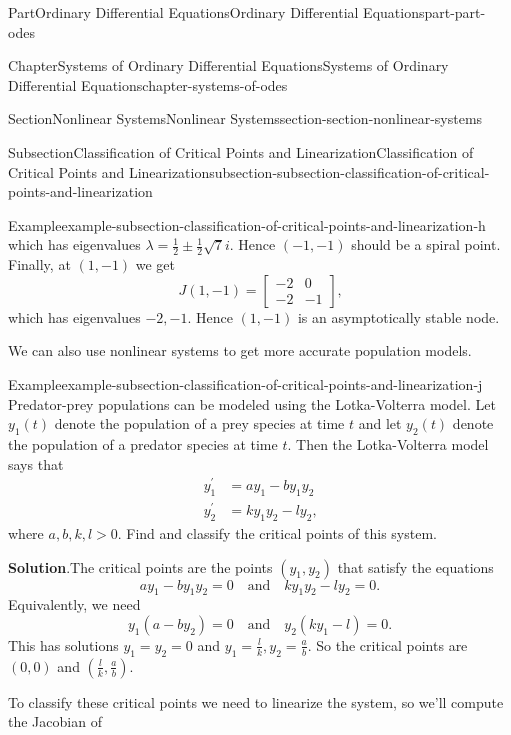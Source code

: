 \documentclass[twoside,10pt,]{book}
\newcommand{\blocktitlefont}{\relax}
\numberwithin{equation}{part}
\begin{document}
\begin{partptx}{Part}{Ordinary Differential Equations}{}{Ordinary Differential Equations}{}{}{part-part-odes}
\begin{chapterptx}{Chapter}{Systems of Ordinary Differential Equations}{}{Systems of Ordinary Differential Equations}{}{}{chapter-systems-of-odes}
\begin{sectionptx}{Section}{Nonlinear Systems}{}{Nonlinear Systems}{}{}{section-section-nonlinear-systems}
\begin{subsectionptx}{Subsection}{Classification of Critical Points and Linearization}{}{Classification of Critical Points and Linearization}{}{}{subsection-subsection-classification-of-critical-points-and-linearization}
\begin{example}{Example}{}{example-subsection-classification-of-critical-points-and-linearization-h}
which has eigenvalues \(\lambda = \frac{1}{2}\pm\frac{1}{2}\sqrt{7}i\). Hence \((-1,-1)\) should be a spiral point. Finally, at \((1,-1)\) we get%
\begin{equation*}
J(1,-1) = \begin{bmatrix} -2 & 0 \\ -2 & -1\end{bmatrix}\text{,}
\end{equation*}
which has eigenvalues \(-2,-1\). Hence \((1,-1)\) is an asymptotically stable node.%
\end{example}
%
We can also use nonlinear systems to get more accurate population models.%
\begin{example}{Example}{}{example-subsection-classification-of-critical-points-and-linearization-j}%
Predator-prey populations can be modeled using the Lotka-Volterra model. Let \(y_{1}(t)\) denote the population of a prey species at time \(t\) and let \(y_{2}(t)\) denote the population of a predator species at time \(t\). Then the Lotka-Volterra model says that%
\begin{align*}
y^\prime_{1} & = ay_{1}-by_{1}y_{2}\\
y^\prime_{2} & = ky_{1}y_{2} - ly_{2}\text{,}
\end{align*}
where \(a,b,k,l>0\). Find and classify the critical points of this system.%
\par\smallskip%
\noindent\textbf{\blocktitlefont Solution}.\hypertarget{solution-subsection-classification-of-critical-points-and-linearization-j-b}{}\quad{}The critical points are the points \((y_{1},y_{2})\) that satisfy the equations%
\begin{equation*}
ay_{1}-by_{1}y_{2} = 0\quad\text{and}\quad ky_{1}y_{2} - ly_{2} = 0.
\end{equation*}
Equivalently, we need%
\begin{equation*}
y_{1}(a-by_{2}) = 0\quad\text{and}\quad y_{2}(ky_{1}-l) = 0.
\end{equation*}
This has solutions \(y_{1} = y_{2} = 0\) and \(y_{1} = \frac{l}{k},y_{2} = \frac{a}{b}\). So the critical points are \((0,0)\) and \((\frac{l}{k},\frac{a}{b})\).%
\par
To classify these critical points we need to linearize the system, so we'll compute the Jacobian of%
\begin{equation*}

\end{equation*}
\end{example}
\end{subsectionptx}
\end{sectionptx}
\end{chapterptx}
\end{partptx}
\end{document}
